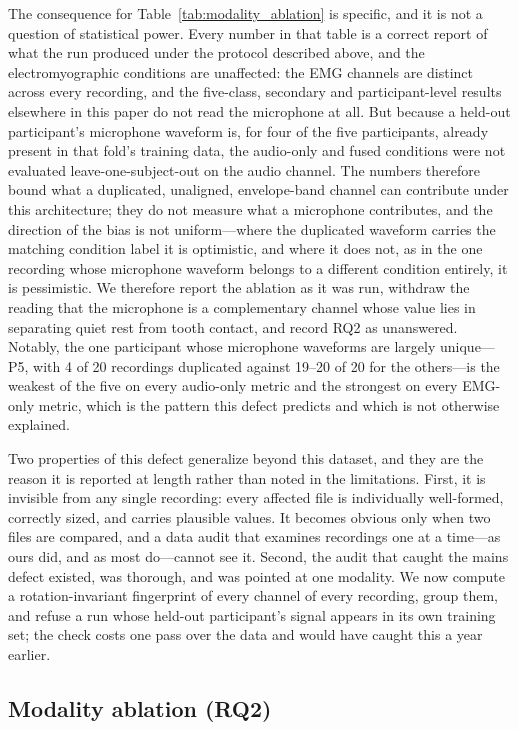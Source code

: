 \documentclass[pdflatex,sn-nature,iicol]{sn-jnl}
\begin{document}
The consequence for Table~\ref{tab:modality_ablation} is specific, and it is not a question of statistical power. Every number in that table is a correct report of what the run produced under the protocol described above, and the electromyographic conditions are unaffected: the EMG channels are distinct across every recording, and the five-class, secondary and participant-level results elsewhere in this paper do not read the microphone at all. But because a held-out participant's microphone waveform is, for four of the five participants, already present in that fold's training data, the audio-only and fused conditions were not evaluated leave-one-subject-out on the audio channel. The numbers therefore bound what a duplicated, unaligned, envelope-band channel can contribute under this architecture; they do not measure what a microphone contributes, and the direction of the bias is not uniform---where the duplicated waveform carries the matching condition label it is optimistic, and where it does not, as in the one recording whose microphone waveform belongs to a different condition entirely, it is pessimistic. We therefore report the ablation as it was run, withdraw the reading that the microphone is a complementary channel whose value lies in separating quiet rest from tooth contact, and record RQ2 as unanswered. Notably, the one participant whose microphone waveforms are largely unique---P5, with 4 of 20 recordings duplicated against 19--20 of 20 for the others---is the weakest of the five on every audio-only metric and the strongest on every EMG-only metric, which is the pattern this defect predicts and which is not otherwise explained.

Two properties of this defect generalize beyond this dataset, and they are the reason it is reported at length rather than noted in the limitations. First, it is invisible from any single recording: every affected file is individually well-formed, correctly sized, and carries plausible values. It becomes obvious only when two files are compared, and a data audit that examines recordings one at a time---as ours did, and as most do---cannot see it. Second, the audit that caught the mains defect existed, was thorough, and was pointed at one modality. We now compute a rotation-invariant fingerprint of every channel of every recording, group them, and refuse a run whose held-out participant's signal appears in its own training set; the check costs one pass over the data and would have caught this a year earlier.

\subsection{Modality ablation (RQ2)}
\end{document}
